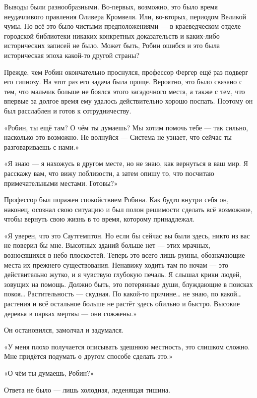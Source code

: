 \documentclass[a4paper,12pt]{book}
\begin{document}
Выводы были разнообразными. Во-первых, возможно, это было время неудачливого правления Оливера Кромвеля. Или, во-вторых, периодом Великой чумы. Но всё это было чистыми предположениями — в краеведческом отделе городской библиотеки никаких конкретных доказательств и каких-либо исторических записей не было. Может быть, Робин ошибся и это была историческая эпоха какой-то другой страны?\\
\par
Прежде, чем Робин окончательно проснулся, профессор Фергер ещё раз подверг его гипнозу. На этот раз его задача была проще. Вероятно, это было связано с тем, что мальчик больше не боялся этого загадочного места, а также с тем, что впервые за долгое время ему удалось действительно хорошо поспать. Поэтому он был расслаблен и готов к сотрудничеству.
\par
«Робин, ты ещё там? О чём ты думаешь? Мы хотим помочь тебе — так сильно, насколько это возможно. Не волнуйся — Система не узнает, что сейчас ты разговариваешь с нами.»
\par
«Я знаю — я нахожусь в другом месте, но не знаю, как вернуться в ваш мир. Я расскажу вам, что вижу поблизости, а затем опишу то, что посчитаю примечательными местами. Готовы?»
\par
Профессор был поражен спокойствием Робина. Как будто внутри себя он, наконец, осознал свою ситуацию и был полон решимости сделать всё возможное, чтобы вернуть свою жизнь в то время, которому принадлежал.
\par
«Я уверен, что это Саутгемптон. Но если бы сейчас вы были здесь, никто из вас не поверил бы мне. Высотных зданий больше нет — этих мрачных, возносящихся в небо плоскостей. Теперь это всего лишь руины, обозначающие места их прежнего существования. Ненавижу ходить там по ночам — это действительно жутко, и я чувствую глубокую печаль. Я слышал крики людей, зовущих на помощь. Должно быть, это потерянные души, блуждающие в поисках покоя… Растительность — скудная. По какой-то причине…  не знаю, по какой… растения и всё остальное больше не растёт здесь обильно и быстро. Высокие деревья в парках мертвы — они сожжены.»
\par
Он остановился, замолчал и задумался.
\par
«У меня плохо получается описывать здешнюю местность, это слишком сложно. Мне придётся подумать о другом способе сделать это.»
\par
«О чём ты думаешь, Робин?»
\par
Ответа не было — лишь холодная, леденящая тишина.
\par
\end{document}
